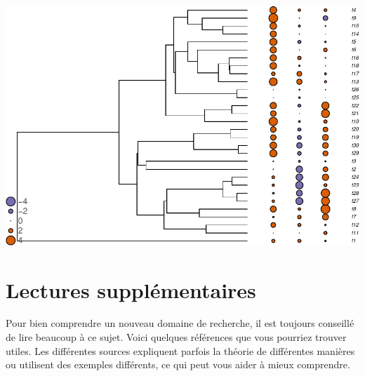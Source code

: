 \documentclass[
]{book}
\begin{document}
\begin{center}\includegraphics{pcm-workshop_files/figure-latex/PlotContinuousParameter_tablephylo4d-1} \end{center}

\chapter{Lectures supplémentaires}\label{lectures-suppluxe9mentaires}

Pour bien comprendre un nouveau domaine de recherche, il est toujours conseillé de lire beaucoup à ce sujet. Voici quelques références que vous pourriez trouver utiles. Les différentes sources expliquent parfois la théorie de différentes manières ou utilisent des exemples différents, ce qui peut vous aider à mieux comprendre.
\end{document}
